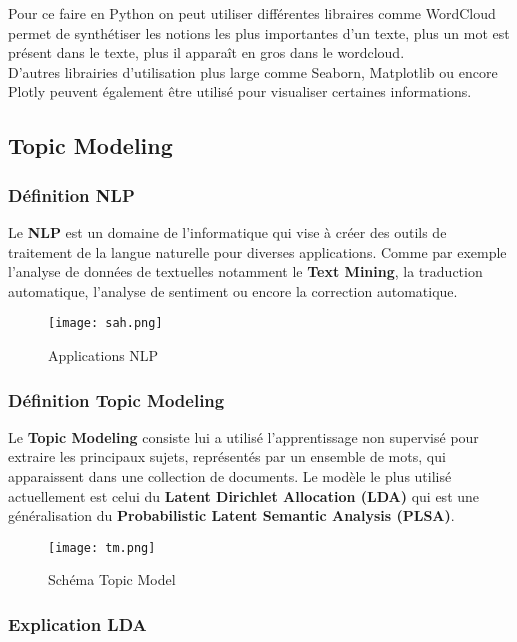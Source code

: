 \documentclass[a4paper,french,12pt]{article}
\begin{document}
Pour ce faire en Python on peut utiliser différentes libraires comme WordCloud permet de synthétiser les notions les plus importantes d’un texte, plus un mot est présent dans le texte, plus il apparaît en gros dans le wordcloud.\\

D'autres librairies d'utilisation plus large comme Seaborn, Matplotlib ou encore Plotly peuvent également être utilisé pour visualiser certaines informations.

\subsection{Topic Modeling}

\subsubsection{Définition NLP}

Le \textbf{NLP} est un domaine de l'informatique qui vise à créer des outils de traitement de la langue naturelle pour diverses applications. Comme par exemple l'analyse de données de textuelles notamment le \textbf{Text Mining}, la traduction automatique, l'analyse de sentiment ou encore la correction automatique.\\

\begin{figure}[!h]
    \centering
    \texttt{[image: sah.png]}
    \caption{Applications NLP}
\end{figure}

\subsubsection{Définition Topic Modeling}

Le \textbf{Topic Modeling} consiste lui a utilisé l'apprentissage non supervisé pour extraire les principaux sujets, représentés par un ensemble de mots, qui apparaissent dans une collection de documents. Le modèle le plus utilisé actuellement est celui du \textbf{Latent Dirichlet Allocation (LDA)} qui est une généralisation du \textbf{Probabilistic Latent Semantic Analysis (PLSA)}.\\

\begin{figure}[!h]
    \centering
    \texttt{[image: tm.png]}
    \caption{Schéma Topic Model}
\end{figure}

\subsubsection{Explication LDA}
\end{document}
